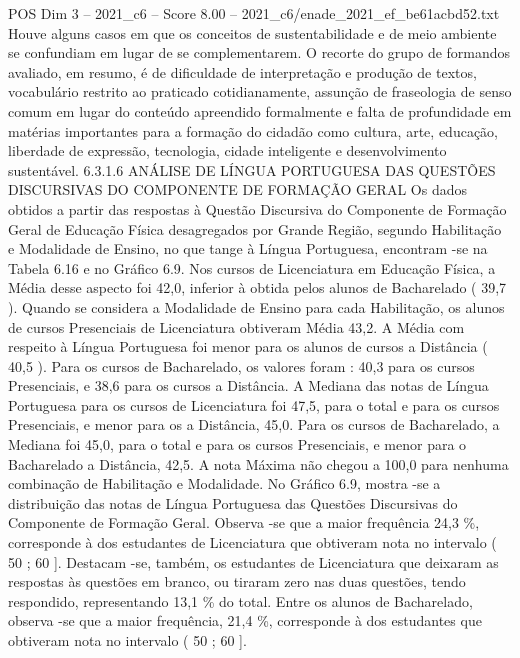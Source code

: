 \begin{textsample}{POS Dim 3 – 2021\_c6 – Score 8.00 – 2021\_c6/enade\_2021\_ef\_be61acbd52.txt}
Houve alguns casos em que os conceitos de sustentabilidade e de meio ambiente se confundiam em lugar de se complementarem.
O recorte do grupo de formandos avaliado, em resumo, é de dificuldade de interpretação e produção de textos, vocabulário restrito ao praticado cotidianamente, assunção de fraseologia de senso comum em lugar do conteúdo apreendido formalmente e falta de profundidade em matérias importantes para a formação do cidadão como cultura, arte, educação, liberdade de expressão, tecnologia, cidade inteligente e desenvolvimento sustentável. 6.3.1.6 ANÁLISE DE LÍNGUA PORTUGUESA DAS QUESTÕES DISCURSIVAS DO COMPONENTE DE FORMAÇÃO GERAL Os dados obtidos a partir das respostas à Questão Discursiva do Componente de Formação Geral de Educação Física desagregados por Grande Região, segundo Habilitação e Modalidade de Ensino, no que tange à Língua Portuguesa, encontram -se na Tabela 6.16 e no Gráfico 6.9.
Nos cursos de Licenciatura em Educação Física, a Média desse aspecto foi 42,0, inferior à obtida pelos alunos de Bacharelado ( 39,7 ).
Quando se considera a Modalidade de Ensino para cada Habilitação, os alunos de cursos Presenciais de Licenciatura obtiveram Média 43,2.
A Média com respeito à Língua Portuguesa foi menor para os alunos de cursos a Distância ( 40,5 ).
Para os cursos de Bacharelado, os valores foram : 40,3 para os cursos Presenciais, e 38,6 para os cursos a Distância.
A Mediana das notas de Língua Portuguesa para os cursos de Licenciatura foi 47,5, para o total e para os cursos Presenciais, e menor para os a Distância, 45,0.
Para os cursos de Bacharelado, a Mediana foi 45,0, para o total e para os cursos Presenciais, e menor para o Bacharelado a Distância, 42,5.
A nota Máxima não chegou a 100,0 para nenhuma combinação de Habilitação e Modalidade.
No Gráfico 6.9, mostra -se a distribuição das notas de Língua Portuguesa das Questões Discursivas do Componente de Formação Geral.
Observa -se que a maior frequência 24,3 \%, corresponde à dos estudantes de Licenciatura que obtiveram nota no intervalo ( 50 ; 60 ].
Destacam -se, também, os estudantes de Licenciatura que deixaram as respostas às questões em branco, ou tiraram zero nas duas questões, tendo respondido, representando 13,1 \% do total.
Entre os alunos de Bacharelado, observa -se que a maior frequência, 21,4 \%, corresponde à dos estudantes que obtiveram nota no intervalo ( 50 ; 60 ].

\end{textsample}
